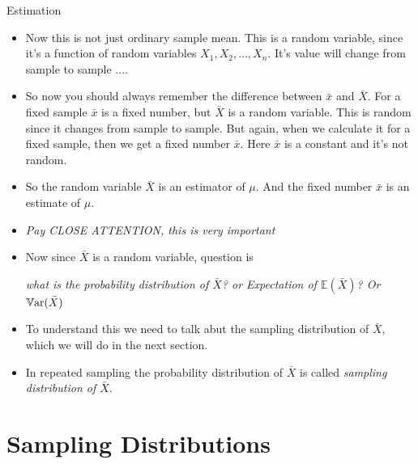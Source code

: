 \documentclass[8pt, usepdftitle=false]{beamer}
\begin{document}
\begin{frame}[allowframebreaks]{Estimation}
\begin{itemize}
  \item Now this is not just ordinary sample mean. This is a random variable, since it's a function of random variables $X_1, X_2, \ldots, X_n$. It's value will change from sample to sample ....


  \item So now you should always remember the difference between $\bar{x}$ and $\bar{X}$. For a fixed sample $\bar{x}$ is a fixed number, but $\bar{X}$ is a random variable. This is random since it changes from sample to sample. But again, when we calculate it for a fixed sample, then we get a fixed number $\bar{x}$. Here $\bar{x}$ is a constant and it's not random.

  \item So the random variable $\bar{X}$ is an estimator of $\mu$. And the fixed number $\bar{x}$ is an estimate of $\mu$.


  \framebreak

  \item \emph{Pay CLOSE ATTENTION, this is very important}


  \item[] Now since $ \bar{X}$ is a random variable, question is 


  \begin{center}
        \emph{what is the probability distribution of $\bar{X} $? or Expectation of $\mathbb{E}(\bar{X})$? Or $\mathbb{V}\mathrm{ar}{(}\bar{X})$}
  \end{center}


\item To understand this we need to talk abut the \alert{sampling distribution of $\bar{X}$}, which we will do in the next section.


\item In repeated sampling the probability distribution of $\bar{X}$ is called \emph{sampling distribution of $\bar{X}$}. 


 
\end{itemize}

\end{frame}


\section{Sampling Distributions}
\frame{\sectionpage}


\end{document}
